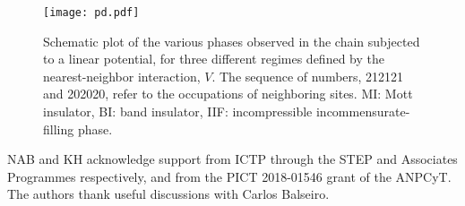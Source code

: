 \documentclass[aps,prl,showpacs,twocolumn,superscriptaddress]{revtex4-2}
\begin{document}



\begin{figure}[h!]
\centering
\texttt{[image: pd.pdf]}
\caption{Schematic plot of the various phases observed in the chain subjected to a linear potential,  for three different regimes defined by the nearest-neighbor interaction,  $V$. The sequence of numbers, 212121 and 202020, refer to the occupations of neighboring sites. MI: Mott insulator, BI: band insulator, IIF: incompressible incommensurate-filling phase. }
\label{PD}
\end{figure}





\vspace{0.3cm}


 NAB and KH acknowledge support from ICTP through the STEP and Associates Programmes respectively, and from the PICT 2018-01546 grant of the ANPCyT. The authors thank useful discussions with Carlos Balseiro.
\end{document}
